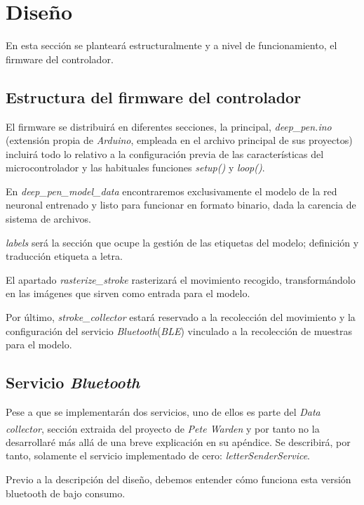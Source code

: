 \section{Diseño}
En esta sección se planteará estructuralmente y a nivel de funcionamiento,
el firmware del controlador.
\subsection{Estructura del firmware del controlador}
El firmware se distribuirá en diferentes secciones, la principal,
\textit{deep\_pen.ino} (extensión propia de \textit{Arduino}, empleada en
el archivo principal de sus proyectos) incluirá todo lo relativo a la
configuración previa de las características del microcontrolador y las
habituales funciones \textit{setup()} y \textit{loop()}.

En \textit{deep\_pen\_model\_data} encontraremos exclusivamente el modelo
de la red neuronal entrenado y listo para funcionar en formato binario,
dada la carencia de sistema de archivos.

\textit{labels} será la sección que ocupe la gestión de las etiquetas del
modelo; definición y traducción etiqueta a letra.

El apartado \textit{rasterize\_stroke} rasterizará el movimiento recogido,
transformándolo en las imágenes que sirven como entrada para el modelo.

Por último, \textit{stroke\_collector} estará reservado a la recolección
del movimiento y la configuración del servicio \textit{Bluetooth}(\textit{BLE})
vinculado a la recolección de muestras para el modelo.

\subsection{Servicio \textit{Bluetooth}\label{servBLE}}
Pese a que se implementarán dos servicios, uno de ellos es parte del \textit{Data collector},
sección extraida del proyecto de \textit{Pete Warden}\textsuperscript{\cite{petewardenmw}}
y por tanto no la desarrollaré más allá de una breve explicación en su apéndice.
Se describirá, por tanto, solamente el servicio implementado de cero:
\textit{letterSenderService}.

Previo a la descripción del diseño, debemos entender cómo funciona esta versión
bluetooth de bajo consumo.

